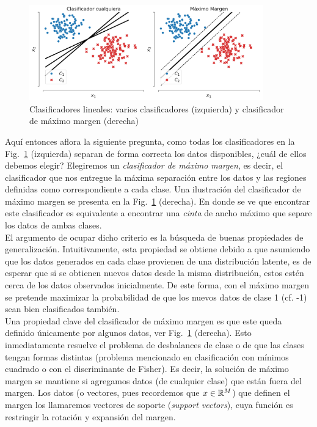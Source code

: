 \begin{figure}[ht]
    \centering
    \includegraphics[width=0.9\textwidth]{img/cap5_max_margen.pdf}
    \caption{Clasificadores lineales: varios clasificadores (izquierda) y clasificador de máximo margen (derecha)}
    \label{fig:maxim_marg} 
\end{figure}

Aquí entonces aflora la siguiente pregunta, como todas los clasificadores en la Fig.~\ref{fig:maxim_marg} (izquierda) separan de forma correcta los datos disponibles, ¿cuál de ellos debemos elegir? Elegiremos un \emph{clasificador de máximo margen}, es decir, el clasificador que nos entregue la máxima separación entre los datos y las regiones definidas como correspondiente a cada clase. Una ilustración del clasificador de máximo margen se presenta en la Fig.~\ref{fig:maxim_marg} (derecha). En donde se ve que encontrar este clasificador es equivalente a encontrar una \emph{cinta} de ancho máximo que separe los datos de ambas clases.\\


El argumento de ocupar dicho criterio es la búsqueda de buenas propiedades de generalización. Intuitivamente, esta propiedad se obtiene debido a que asumiendo que los datos generados en cada clase  provienen de una distribución latente, es de esperar que si se obtienen nuevos datos desde la misma distribución, estos estén cerca de los datos observados inicialmente. De este forma, con el máximo margen se pretende maximizar la probabilidad de que los nuevos datos de clase 1 (cf. -1) sean bien clasificados también.\\

Una propiedad clave del clasificador de máximo margen es que este queda definido únicamente por algunos datos, ver Fig.~\ref{fig:maxim_marg} (derecha). Esto inmediatamente resuelve el problema de desbalances de clase o de que las clases tengan formas distintas (problema mencionado en clasificación con mínimos cuadrado o con el discriminante de Fisher). Es decir, la solución de máximo margen se mantiene si agregamos datos (de cualquier clase) que están fuera del margen. Los datos (o vectores, pues recordemos que $x\in\mathbb{R}^M$) que definen el margen los llamaremos vectores de soporte (\emph{support vectors}), cuya función es restringir la rotación y expansión del margen.\\

